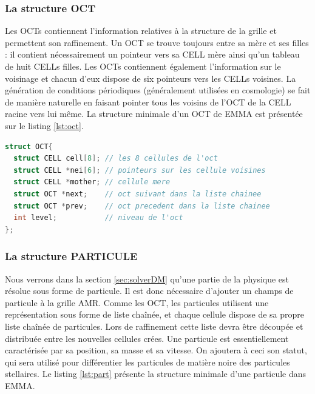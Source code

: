 \subsubsection{La structure OCT}
Les OCTs contiennent l'information relatives à la structure de la grille et permettent son raffinement.
Un OCT se trouve toujours entre sa mère et ses filles : il contient nécessairement un pointeur vers sa CELL mère ainsi qu'un tableau de huit CELLs filles.
Les OCTs contiennent également l'information sur le voisinage et chacun d'eux dispose de six pointeurs vers les CELLs voisines.
La génération de conditions périodiques (généralement utilisées en cosmologie) se fait de manière naturelle en faisant pointer tous les voisins de l'OCT de la CELL racine vers lui même.
La structure minimale d'un OCT de EMMA est présentée sur le listing \ref{lst:oct}.
\begin{lstlisting}[float=bth,language=C,frame=tb,caption={La structure OCT de EMMA},label=lst:oct]
struct OCT{
  struct CELL cell[8]; // les 8 cellules de l'oct
  struct CELL *nei[6]; // pointeurs sur les cellule voisines
  struct CELL *mother; // cellule mere
  struct OCT *next;    // oct suivant dans la liste chainee
  struct OCT *prev;    // oct precedent dans la liste chainee
  int level;           // niveau de l'oct
};
\end{lstlisting}


\subsubsection{La structure PARTICULE}
\label{sec:PART}

Nous verrons dans la section \ref{sec:solverDM} qu'une partie de la physique est résolue sous forme de particule.
Il est donc nécessaire d'ajouter un champs de particule à la grille \ac{AMR}.
Comme les OCT, les particules utilisent une représentation sous forme de liste chaînée, et chaque cellule dispose de sa propre liste chaînée de particules.
Lors de raffinement cette liste devra être découpée et distribuée entre les nouvelles cellules crées.
Une particule est essentiellement caractérisée par sa position, sa masse et sa vitesse.
On ajoutera à ceci son statut, qui sera utilisé pour différentier les particules de matière noire des particules stellaires. 
Le listing \ref{lst:part} présente la structure minimale d'une particule dans EMMA.


